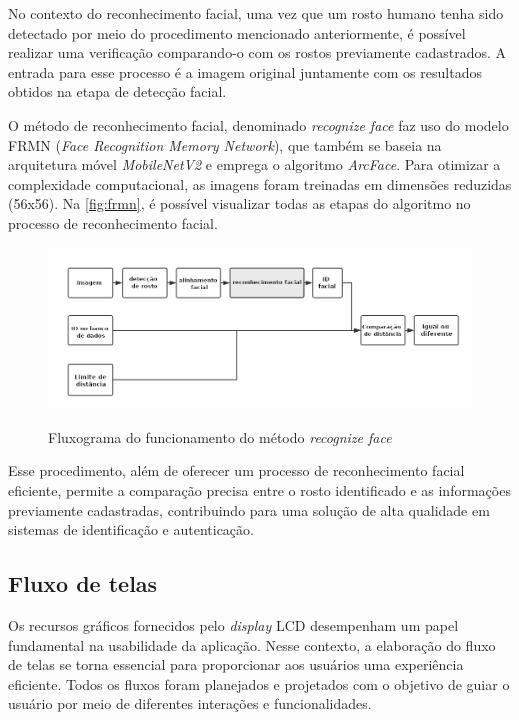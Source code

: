 No contexto do reconhecimento facial, uma vez que um rosto 
humano tenha sido detectado por meio do procedimento 
mencionado anteriormente, é possível realizar uma verificação 
comparando-o com os rostos previamente cadastrados. 
A entrada para esse processo é a imagem original juntamente 
com os resultados obtidos na etapa de detecção facial.

O método de reconhecimento facial, denominado \textit{recognize face}  
faz uso do modelo FRMN (\textit{Face Recognition Memory Network}), que 
também se baseia na arquitetura móvel \textit{MobileNetV2} e emprega o 
algoritmo \textit{ArcFace}. Para otimizar a complexidade computacional, 
as imagens foram treinadas em dimensões reduzidas (56x56). 
Na \autoref{fig:frmn}, é possível visualizar todas as etapas do algoritmo 
no processo de reconhecimento facial.

\begin{figure}[h!]
    \centering
    \caption{Fluxograma do funcionamento do método \textit{recognize face}}
    \includegraphics[scale=0.45]{figuras/face-recognition.png}
    \label{fig:frmn}
    \centering
\end{figure}

Esse procedimento, além de oferecer um processo de reconhecimento 
facial eficiente, permite a comparação precisa entre o rosto 
identificado e as informações previamente cadastradas, 
contribuindo para uma solução de alta qualidade em sistemas 
de identificação e autenticação.

\subsection{Fluxo de telas}\label{sec:telas}

Os recursos gráficos fornecidos pelo \textit{display} LCD desempenham um papel 
fundamental na usabilidade da aplicação. Nesse contexto, a elaboração 
do fluxo de telas se torna essencial para proporcionar aos usuários 
uma experiência eficiente. Todos os fluxos foram planejados e 
projetados com o objetivo de guiar o usuário por meio 
de diferentes interações e funcionalidades.

